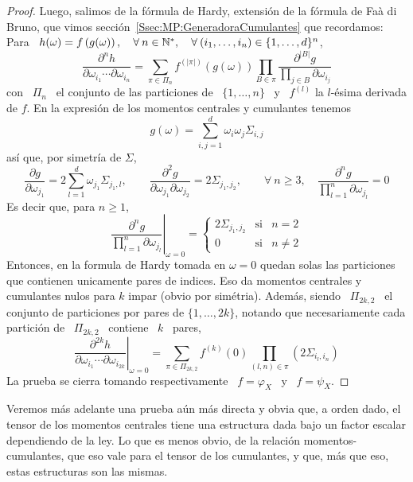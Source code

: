 \begin{proof}
  Luego, salimos de la f\'ormula de  Hardy, extensi\'on de la f\'ormula de Fa\`a
  di   Bruno,   que   vimos   secci\'on~\ref{Ssec:MP:GeneradoraCumulantes}   que
  recordamos: Para \ $h(\omega) =  f\left( g(\omega) \right), \quad \forall \: n
  \in \mathbb{N}^*,  \quad \forall \:  (i_1 , \ldots ,  i_n ) \in  \{ 1 , \ldots  , d
  \}^n$,
  \[
  \frac{\partial^n  h}{\partial  \omega_{i_1}  \cdots \partial  \omega_{i_n}}  =
  \sum_{\pi  \in \Pi_n}  f^{(|\pi|)}\left( g(\omega)  \right) \prod_{B  \in \pi}
  \frac{\partial^{|B|} g}{\displaystyle \prod_{j \in B} \partial \omega_{i_j}}
  \]
  con \ $\Pi_n$ \ el conjunto de las particiones de \ $\{ 1 , \ldots , n \}$ \ y
  \ $f^{(l)}$ la $l$-\'esima derivada de $f$.  En la expresi\'on de los momentos
  centrales y cumulantes tenemos
  \[
  g(\omega) = \sum_{i,j=1}^d \omega_i \omega_j \Sigma_{i,j}
  \]
  as\'i que, por simetr\'ia de $\Sigma$,
  \[
  \frac{\partial  g}{\partial   \omega_{j_1}}  =  2   \sum_{l=1}^d  \omega_{j_1}
  \Sigma_{j_1,l},  \qquad  \frac{\partial^2  g}{\partial  \omega_{j_1}  \partial
    \omega_{j_2}}  =  2 \Sigma_{j_1,j_2},  \qquad  \forall  \:  n \ge  3,  \quad
  \frac{\partial^n g}{\prod_{l=1}^n \partial \omega_{j_l}} = 0
  \]
  Es decir que, para $n \ge 1$,
  \[
  \left.      \frac{\partial^n    g}{\prod_{l=1}^n     \partial    \omega_{j_l}}
  \right|_{\omega = 0} = \left\{\begin{array}{ccl}
  2   \Sigma_{j_1,j_2} & \mbox{si} & n = 2\\[2mm]
  0 & \mbox{si} & n \ne 2
  \end{array}\right.
  \]
  Entonces,  en la formula  de Hardy  tomada en  $\omega =  0$ quedan  solas las
  particiones  que  contienen unicamente  pares  de  indices.   Eso da  momentos
  centrales y cumulantes nulos para $k$ impar (obvio por sim\'etria). Adem\'as,
  siendo \  $\Pi_{2 k , 2}$  \ el conjunto de  particiones por pares de  $\{ 1 ,
  \ldots , 2 k \}$, notando que necesariamente cada partici\'on de \ $\Pi_{2 k ,
    2}$ \ contiene \ $k$ \ pares,
  \[
  \left.    \frac{\partial^{2  k}   h}{\partial  \omega_{i_1}   \cdots  \partial
      \omega_{i_{2  k}}}\right|_{\omega =  0} =  \sum_{\pi  \in \Pi_{2  k ,  2}}
  f^{(k)}(0) \prod_{(l,n) \in \pi} \left( 2 \Sigma_{i_l,i_n} \right)
  \]
  La prueba  se cierra  tomando respectivamente  \ $f =  \varphi_X$ \  y \  $f =
  \psi_X$.
\end{proof}
%
Veremos m\'as adelante una prueba a\'un m\'as directa y obvia que, a orden dado,
el tensor  de los momentos  centrales tiene una  estructura dada bajo  un factor
escalar  dependiendo  de la  ley.   Lo  que es  menos  obvio,  de la  relaci\'on
momentos-cumulantes, que eso vale para el tensor de los cumulantes, y que, m\'as
que eso, estas estructuras son las mismas.

